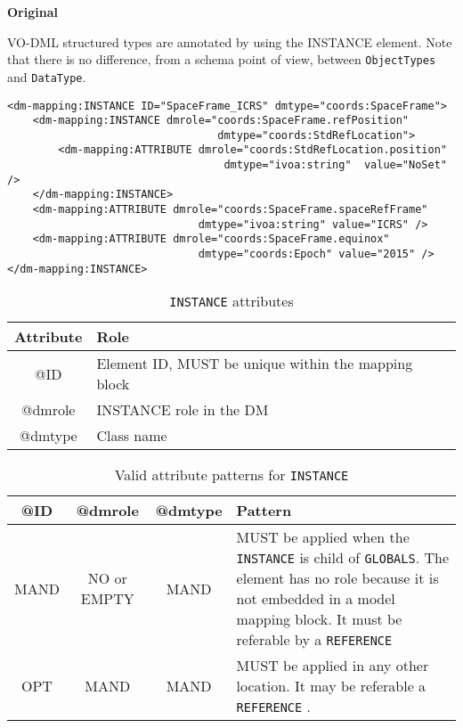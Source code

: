        
\newpage
\textbf{Original}


VO-DML structured types are annotated by using the INSTANCE
element. Note that there is no difference, from a schema point of view,
between \texttt{ObjectTypes} and \texttt{DataType}.


 \begin{lstlisting}[frame=single,caption={INSTANCE child of GLOBALS},style=XML,basicstyle=\tiny]
<dm-mapping:INSTANCE ID="SpaceFrame_ICRS" dmtype="coords:SpaceFrame">
	<dm-mapping:INSTANCE dmrole="coords:SpaceFrame.refPosition"
                                 dmtype="coords:StdRefLocation">
		<dm-mapping:ATTRIBUTE dmrole="coords:StdRefLocation.position" 
		                          dmtype="ivoa:string"  value="NoSet" />
	</dm-mapping:INSTANCE>
	<dm-mapping:ATTRIBUTE dmrole="coords:SpaceFrame.spaceRefFrame" 
	                          dmtype="ivoa:string" value="ICRS" />
	<dm-mapping:ATTRIBUTE dmrole="coords:SpaceFrame.equinox" 
	                          dmtype="coords:Epoch"	value="2015" />
</dm-mapping:INSTANCE>
\end{lstlisting}


\begin{table}[!htbp]
\small
\centering
\begin{tabulary}{\linewidth}{|c|J|}       
       \hline 
            \textbf{Attribute} & 
            \textbf {Role}\\
       \hline         \hline  
            @ID & 
            Element ID, MUST be unique within the mapping block  \\
        \hline 
            @dmrole & 
            INSTANCE role in the DM \\
        \hline 
            @dmtype & 
            Class name \\
        \hline 
     \end{tabulary}
     \caption{\texttt{INSTANCE} attributes} 
     \label{tbl:instance-att}
 \end{table}

\begin{table}[!htbp]
\small
\centering
\begin{tabulary}{\linewidth}{|c|c|c|J|}
    \hline 
        \textbf{@ID} &
        \textbf{@dmrole} &
        \textbf{@dmtype} &
        \textbf{Pattern}\\
    \hline      \hline  
        MAND &           
        NO or EMPTY&           
        MAND &           
        MUST be applied when the  \texttt{INSTANCE} is child of \texttt{GLOBALS}. The element has no role because it is not embedded in a model mapping block. It must be referable by a \texttt{REFERENCE}  \\
    \hline   
        OPT &           
        MAND &           
        MAND &           
        MUST be applied in any other location. It may be referable a \texttt{REFERENCE} . \\
   \hline 
\end{tabulary}
     \caption{Valid attribute patterns for  \texttt{INSTANCE}} 
     \label{tbl:instance-pattern}
 \end{table}


